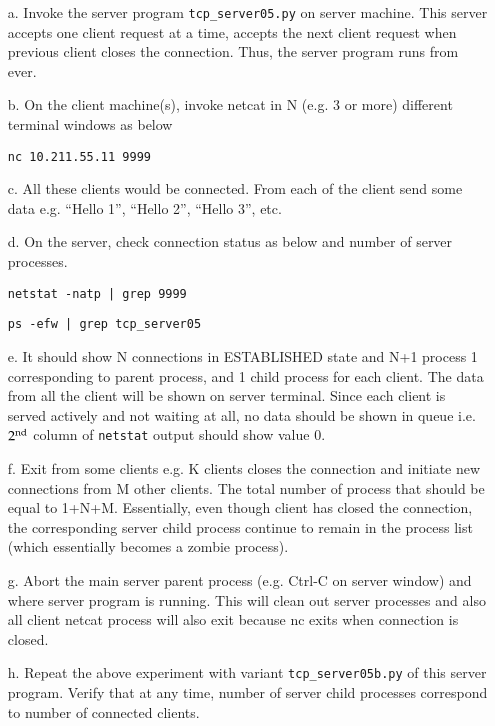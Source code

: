 \begin{multicols}{2}
\begin{itemize}

\item[a.] Invoke the server program \texttt{tcp\_server05.py} on server machine. This server accepts one client request at a time, accepts the next client request when previous client closes the connection. Thus, the server program runs from ever.

\item[b.] On the client machine(s), invoke netcat in N (e.g. 3 or more) different terminal windows as below

\texttt{nc 10.211.55.11 9999}

\item[c.] All these clients would be connected. From each of the client send some data e.g. “Hello 1”, “Hello 2”, “Hello 3”, etc.

\item[d.] On the server, check connection status as below and number of server processes. 
 
 \texttt{netstat -natp | grep 9999}
 
 \texttt{ps -efw | grep tcp\_server05}
 
\item[e.] It should show N connections in ESTABLISHED state and N+1 process 1 corresponding to parent process, and 1 child process for each client. The data from all the client will be shown on server terminal. Since each client is served actively and not waiting at all, no data should be shown in queue i.e. $2^{\rm nd}$ column of \texttt{netstat} output should show value 0.

\item[f.] Exit from some clients e.g. K clients closes the connection and initiate new connections from M other clients. The total number of process that should be equal to 1+N+M. Essentially, even though client has closed the connection, the corresponding server child process continue to remain in the process list (which essentially becomes a zombie process).

\item[g.] Abort the main server parent process (e.g. Ctrl-C on server window) and where server program is running. This will clean out server processes and also all client netcat process will also exit because nc exits when connection is closed.

\item[h.] Repeat the above experiment with variant \texttt{tcp\_server05b.py} of this server program. Verify that at any time, number of server child processes correspond to number of connected clients.


\end{itemize}
\end{multicols}
